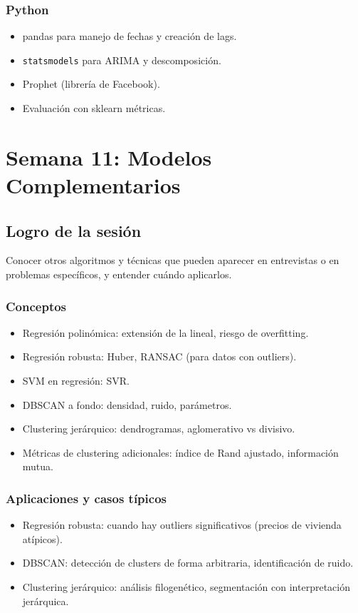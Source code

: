 \documentclass[12pt,a4paper,openany,oneside]{book}
\begin{document}
\subsection{Python}
\begin{itemize}
    \item pandas para manejo de fechas y creación de lags.
    \item \texttt{statsmodels} para ARIMA y descomposición.
    \item Prophet (librería de Facebook).
    \item Evaluación con sklearn métricas.
\end{itemize}

\chapter{Semana 11: Modelos Complementarios}

\section{Logro de la sesión}
Conocer otros algoritmos y técnicas que pueden aparecer en entrevistas o en problemas específicos, y entender cuándo aplicarlos.

\subsection{Conceptos}
\begin{itemize}
    \item Regresión polinómica: extensión de la lineal, riesgo de overfitting.
    \item Regresión robusta: Huber, RANSAC (para datos con outliers).
    \item SVM en regresión: SVR.
    \item DBSCAN a fondo: densidad, ruido, parámetros.
    \item Clustering jerárquico: dendrogramas, aglomerativo vs divisivo.
    \item Métricas de clustering adicionales: índice de Rand ajustado, información mutua.
\end{itemize}

\subsection{Aplicaciones y casos típicos}
\begin{itemize}
    \item Regresión robusta: cuando hay outliers significativos (precios de vivienda atípicos).
    \item DBSCAN: detección de clusters de forma arbitraria, identificación de ruido.
    \item Clustering jerárquico: análisis filogenético, segmentación con interpretación jerárquica.
\end{itemize}
\end{document}
